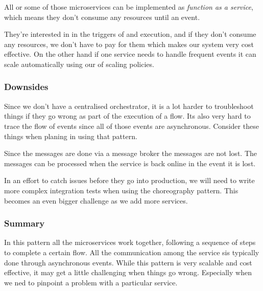 All or some of those microservices can be implemented as \textit{function as a service}, which means they don't consume any resources until an event.

They're interested in in the triggers of and execution, and if they don't consume any resources, we don't have to pay for them which makes our system very cost effective.
On the other hand if one service needs to handle frequent events it can scale automatically using our of scaling policies.

\subsubsection{Downsides}
Since we don't have a centralised orchestrator, it is a lot harder to troubleshoot things if they go wrong as part of the execution of a flow.
Its also very hard to trace the flow of events since all of those events are asynchronous.
Consider these things when planing in using that pattern.

\begin{note}
    Since the messages are done via a message broker the messages are not lost.
    The messages can be processed when the service is back online in the event it is lost.
\end{note}

In an effort to catch issues before they go into production, we will need to write more complex integration tests when using the choreography pattern.
This becomes an even bigger challenge as we add more services.

\subsubsection{Summary}
In this pattern all the microservices work together, following a sequence of steps to complete a certain flow.
All the communication among the service sis typically done through asynchronous events.
While this pattern is very scalable and cost effective, it may get a little challenging when things go wrong.
Especially when we ned to pinpoint a problem with a particular service.